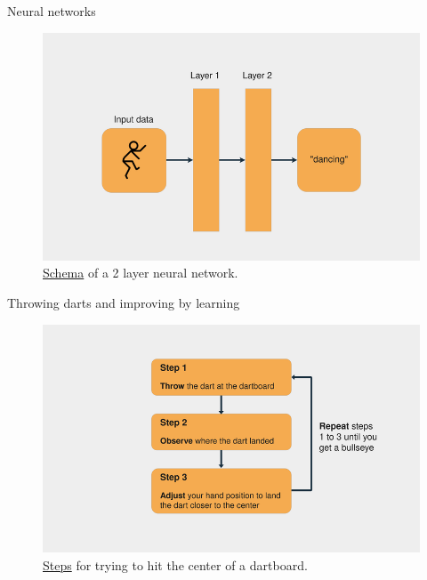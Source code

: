 \documentclass{beamer}
\begin{document}
\begin{frame}{Neural networks}
    \begin{figure}
        \includegraphics[width=0.9\linewidth]{2layerNN}
        \caption{ \href{https://realpython.com/python-ai-neural-network/}{Schema} of a 2 layer neural network.}
        \label{Fig:FeatureEngineering}
    \end{figure}
\end{frame}

\begin{frame}{Throwing darts and improving by learning}
    \begin{figure}
        \includegraphics[width=0.9\linewidth]{TrainingDart}
        \caption{\href{https://realpython.com/python-ai-neural-network/}{Steps} for trying to hit the center of a dartboard.}
        \label{Fig:TrainingDart}
    \end{figure}
\end{frame}
\end{document}
